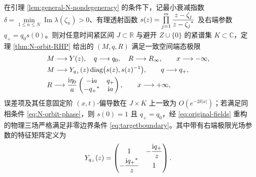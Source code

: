 \begin{lemma}\label{lem:general-N-endstates}
在引理 \ref{lem:general-N-nondegeneracy} 的条件下，记最小衰减指数 $\delta=\min\limits_{1\le n\le N}\operatorname{Im}\lambda(\zeta_n)>0$、有理透射函数 $s(z)=\prod\limits_{j=1}^{m}\dfrac{z-\zeta_j}{z-{\zeta_j}^{*}}$ 及右端参数 $q_+=q_0s(0)$。则对任意时间紧区间 $J\subset\mathbb R$ 与避开 $Z\cup\{0\}$ 的紧谱集 $K\subset\mathbb C$，定理 \ref{thm:N-orbit-RHP} 给出的 $(M,q,R)$ 满足一致空间端态极限
\begin{align}
&M\longrightarrow Y(z),\quad q\longrightarrow q_0,\quad R\longrightarrow R_\infty,\qquad x\longrightarrow-\infty,\label{eq:general-N-M-ends}\\
&\begin{aligned}
&M\longrightarrow Y_{q_+}(z)\operatorname{diag}\bigl(s(z),s(z)^{-1}\bigr),\qquad q\longrightarrow q_+,\\
&R\longrightarrow\dfrac{\mathrm{i}\eta_0}{a}\begin{pmatrix}-\mathrm{i} a&q_+\\-{q_+}^{*}&\mathrm{i} a\end{pmatrix},\qquad x\longrightarrow+\infty,
\end{aligned}\label{eq:general-N-field-ends}
\end{align}
误差项及其任意固定阶 $(x,t)$-偏导数在 $J\times K$ 上一致为 $O(e^{-2\delta|x|})$；若满足同相条件 \eqref{eq:N-orbit-phase}，则 $s(0)=1$ 且 $q_+=q_0$，经 \eqref{eq:original-fields} 重构的物理三场严格满足非零边界条件 \eqref{eq:targetboundary}。其中带有右端极限光场参数的特征矩阵定义为
\begin{equation*}
Y_{q_+}(z)=\begin{pmatrix}1&-\dfrac{\mathrm{i} q_+}{z}\\-\dfrac{\mathrm{i}{q_+}^{*}}{z}&1\end{pmatrix}.
\end{equation*}
\end{lemma}
